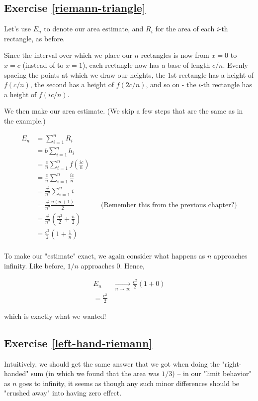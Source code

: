 \documentclass{book}
\begin{document}
\subsection{Exercise \ref{riemann-triangle}}

Let's use $E_n$ to denote our area estimate, and $R_i$ for the area of each $i$-th rectangle, as before. 

Since the interval over which we place our $n$ rectangles is now from $x = 0$ to $x = c$ (instead of to $x = 1$), each rectangle now has a base of length $c/n$. Evenly spacing the points at which we draw our heights, the 1st rectangle has a height of $f(c/n)$, the second has a height of $f(2c/n)$, and so on - the $i$-th rectangle has a height of $f(ic/n)$. 

We then make our area estimate. (We skip a few steps that are the same as in the example.)

\begin{align*}
E_n &= \sum_{i=1}^n R_i \\
&= b \sum_{i=1}^n h_i \\
&= \frac{c}{n} \sum_{i=1}^n f(\frac{ic}{n}) \\
&= \frac{c}{n} \sum_{i=1}^n \frac{ic}{n} \\
&= \frac{c^2}{n^2} \sum_{i=1}^n i \\
&= \frac{c^2}{n^2} \frac{n(n+1)}{2} && \text{(Remember this from the previous chapter?)} \\
&= \frac{c^2}{n^2} \left( \frac{n^2}{2} + \frac{n}{2} \right) \\
&= \frac{c^2}{2} \left( 1 + \frac{1}{n} \right) \\
\end{align*}

To make our "estimate" exact, we again consider what happens as $n$ approaches infinity. Like before, $1/n$ approaches 0. Hence,

\begin{align*}
E_n &\xrightarrow[n \to \infty]{} \frac{c^2}{2} \left( 1 + 0 \right)  \\
= \frac{c^2}{2}
\end{align*}

which is exactly what we wanted!


\subsection{Exercise \ref{left-hand-riemann}}

Intuitively, we should get the same answer that we got when doing the "right-handed" sum (in which we found that the area was $1/3$) -- in our "limit behavior" as $n$ goes to infinity, it seems as though any such minor differences should be "crushed away" into having zero effect. 
\end{document}
